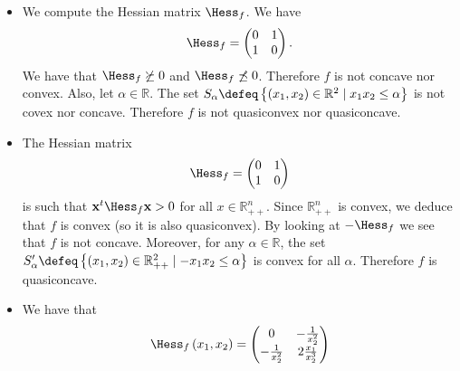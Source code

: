 \documentclass{article}
\begin{document}
     \begin{exo}
     \end{exo}
     \begin{itemize}
         \item We compute the Hessian
             matrix $\Hess_{f}$.
             We have
             \begin{equation*}
                 \Hess_{f} = \begin{pmatrix}
                     0 & 1 \\
                     1 & 0
                 \end{pmatrix}.
             \end{equation*}
             We have that $\Hess_{f} \not \succeq 0$
             and $\Hess_{f} \not \preceq 0$.
             Therefore $f$ is not concave nor convex.
             Also, let $\alpha \in \mathbb{R}$.
             The set $S_{\alpha} \defeq
             \left\{\left(x_1, x_2\right) \in \mathbb{R}^{2} \mid x_1 x_2 \leq \alpha\right\}$ 
             is not covex nor concave.
             Therefore $f$ is not 
             quasiconvex nor quasiconcave.
         \item The Hessian matrix
             \begin{equation*}
                 \Hess_{f} = \begin{pmatrix}
                     0 & 1 \\
                     1 & 0
                 \end{pmatrix}
             \end{equation*}
             is such that $\mathbf{x}^{t} \Hess_{f} \mathbf{x} > 0$
             for all $x \in \mathbb{R}_{++}^{n}$.
             Since $\mathbb{R}_{++}^{n}$ is convex,
             we deduce that $f$ is convex
             (so it is also quasiconvex).
             By looking at $-\Hess_{f}$ we see
             that $f$ is not concave.
             Moreover, for any $\alpha \in \mathbb{R}$,
             the set $S_{\alpha}' \defeq 
             \left\{\left(x_1, x_2\right) \in \mathbb{R}^{2}_{++} 
             \mid - x_1 x_2 \leq \alpha\right\}$ 
             is convex for all $\alpha$.
             Therefore $f$ is quasiconcave.
         \item We have that
             \begin{equation*}
                 \Hess_{f}\left(x_1, x_2\right) = \begin{pmatrix}
                     0 & -\frac{1}{x_{2}^{2}} \\
                     -\frac{1}{x_{2}^{2}} & 2 \frac{x_1}{x_2^{3}}

\end{pmatrix}
\end{equation*}
\end{itemize}
\end{document}
